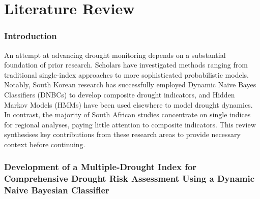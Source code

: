 \graphicspath{{literature/fig/}}

\chapter{Literature Review}
\label{chap:literature}

\subsection*{Introduction}

An attempt at advancing drought monitoring depends on a substantial foundation of prior research. Scholars have investigated methods ranging from traditional single-index approaches to more sophisticated probabilistic models. Notably, South Korean research has successfully employed Dynamic Naïve Bayes Classifiers (DNBCs) to develop composite drought indicators, and Hidden Markov Models (HMMs) have been used elsewhere to model drought dynamics. In contrast, the majority of South African studies concentrate on single indices for regional analyses, paying little attention to composite indicators. This review synthesises key contributions from these research areas to provide necessary context before continuing.

\subsection*{Development of a Multiple-Drought Index for Comprehensive Drought Risk Assessment Using a Dynamic Naive Bayesian Classifier}

